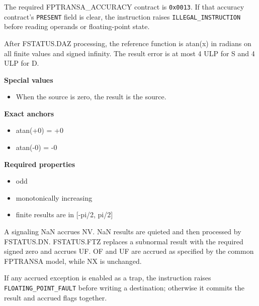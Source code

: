 The required FPTRANSA\_ACCURACY contract is \texttt{0x0013}. If that accuracy contract's \texttt{PRESENT} field is clear, the instruction raises \texttt{ILLEGAL\_INSTRUCTION} before reading operands or floating-point state.

After FSTATUS.DAZ processing, the reference function is atan(x) in radians on all finite values and signed infinity. The result error is at most 4 ULP for S and 4 ULP for D.

\textbf{Special values}\par
\begin{itemize}
\item When the source is zero, the result is the source.
\end{itemize}

\textbf{Exact anchors}\par
\begin{itemize}
\item atan(+0) = +0
\item atan(-0) = -0
\end{itemize}

\textbf{Required properties}\par
\begin{itemize}
\item odd
\item monotonically increasing
\item finite results are in [-pi/2, pi/2]
\end{itemize}

A signaling NaN accrues NV. NaN results are quieted and then processed by FSTATUS.DN. FSTATUS.FTZ replaces a subnormal result with the required signed zero and accrues UF. OF and UF are accrued as specified by the common FPTRANSA model, while NX is unchanged.

If any accrued exception is enabled as a trap, the instruction raises \texttt{FLOATING\_POINT\_FAULT} before writing a destination; otherwise it commits the result and accrued flags together.

